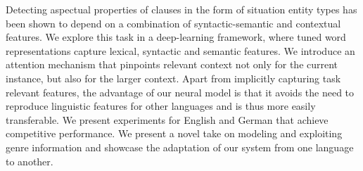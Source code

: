 Detecting aspectual properties of clauses in the form of situation entity types has been shown to depend on a combination of syntactic-semantic and contextual features. We explore this task in a deep-learning framework, where tuned word representations capture lexical, syntactic and semantic features. We introduce an attention mechanism that pinpoints relevant context not only for the current instance, but also for the larger context. Apart from implicitly capturing task relevant features, the advantage of our neural model is that it avoids the need to reproduce linguistic features for other languages and is thus more easily transferable. We present experiments for English and German that achieve competitive performance. We present a novel take on modeling and exploiting genre information and showcase the adaptation of our system from one language to another.
